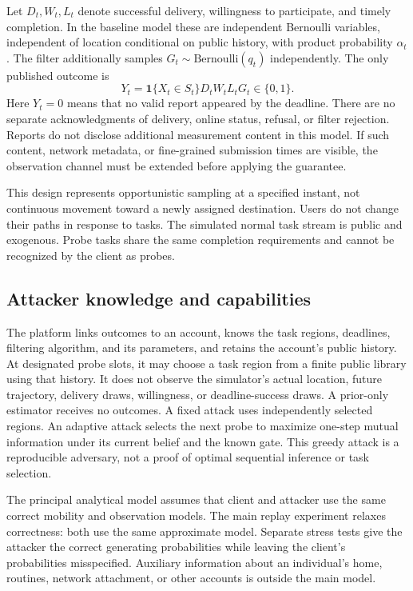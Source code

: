 \documentclass[3p,times]{elsarticle}
\newcommand{\ind}{\mathbf{1}}
\begin{document}
Let $D_t,W_t,L_t$ denote successful delivery, willingness to participate, and timely completion. In the baseline model these are independent Bernoulli variables, independent of location conditional on public history, with product probability $\alpha_t$. The filter additionally samples $G_t\sim\mathrm{Bernoulli}(q_t)$ independently. The only published outcome is
\begin{equation}
 Y_t=\ind\{X_t\in S_t\}D_tW_tL_tG_t\in\{0,1\}.
 \label{eq:output}
\end{equation}
Here $Y_t=0$ means that no valid report appeared by the deadline. There are no separate acknowledgments of delivery, online status, refusal, or filter rejection. Reports do not disclose additional measurement content in this model. If such content, network metadata, or fine-grained submission times are visible, the observation channel must be extended before applying the guarantee.

This design represents opportunistic sampling at a specified instant, not continuous movement toward a newly assigned destination. Users do not change their paths in response to tasks. The simulated normal task stream is public and exogenous. Probe tasks share the same completion requirements and cannot be recognized by the client as probes.

\subsection{Attacker knowledge and capabilities}
The platform links outcomes to an account, knows the task regions, deadlines, filtering algorithm, and its parameters, and retains the account's public history. At designated probe slots, it may choose a task region from a finite public library using that history. It does not observe the simulator's actual location, future trajectory, delivery draws, willingness, or deadline-success draws. A prior-only estimator receives no outcomes. A fixed attack uses independently selected regions. An adaptive attack selects the next probe to maximize one-step mutual information under its current belief and the known gate. This greedy attack is a reproducible adversary, not a proof of optimal sequential inference or task selection.

The principal analytical model assumes that client and attacker use the same correct mobility and observation models. The main replay experiment relaxes correctness: both use the same approximate model. Separate stress tests give the attacker the correct generating probabilities while leaving the client's probabilities misspecified. Auxiliary information about an individual's home, routines, network attachment, or other accounts is outside the main model.
\end{document}

